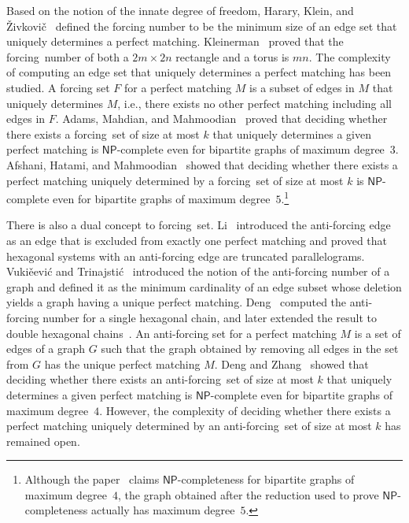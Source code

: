 \documentclass[a4paper,10pt]{article}
\newcommand{\NP}{$\mathsf{NP}$}
\newcommand{\NPc}{$\mathsf{NP}$-complete}
\newcommand{\FS}{\rm forcing~set}
\newcommand{\AFS}{\rm anti-forcing~set}
\newcommand{\FN}{\rm forcing~number}
\begin{document}
Based on the notion of the innate degree of freedom, Harary, Klein, and {\v{Z}}ivkovi{\v{c}}~\cite{harary1991graphical} defined the forcing number to be the minimum size of an edge set that uniquely determines a perfect matching.
Kleinerman~\cite{kleinerman2006bounds} proved that the {\FN} of both a $2m \times 2n$ rectangle and a torus is $mn$.
The complexity of computing an edge set that uniquely determines a perfect matching has been studied.
A forcing set $F$ for a perfect matching $M$ is a subset of edges in $M$ that uniquely determines $M$, i.e., there exists no other perfect matching including all edges in $F$.
Adams, Mahdian, and Mahmoodian~\cite{adams2004forced} proved that deciding whether there exists a {\FS} of size at most $k$ that uniquely determines a given perfect matching is {\NPc} even for bipartite graphs of maximum degree~$3$.
Afshani, Hatami, and Mahmoodian~\cite{afshani2009spectrum} showed that deciding whether there exists a perfect matching uniquely determined by a {\FS} of size at most $k$ is {\NPc} even for bipartite graphs of maximum degree~$5$.\footnote{Although the paper~\cite{afshani2009spectrum} claims {\NP}-completeness for bipartite graphs of maximum degree~$4$, the graph obtained after the reduction used to prove {\NP}-completeness actually has maximum degree~$5$.} 

There is also a dual concept to {\FS}.
Li~\cite{LI1997295} introduced the anti-forcing edge as an edge that is excluded from exactly one perfect matching and proved that hexagonal systems with an anti-forcing edge are truncated parallelograms.
Vuki{\v{e}}evi{\'c} and Trinajsti{\'c}~\cite{vukiveevic2007anti} introduced the notion of the anti-forcing number of a graph and defined it as the minimum cardinality of an edge subset whose deletion yields a graph having a unique perfect matching.
Deng~\cite{deng2007anti} computed the anti-forcing number for a single hexagonal chain, and later extended the result to double hexagonal chains~\cite{deng2008anti}.
An anti-forcing set for a perfect matching $M$ is a set of edges of a graph $G$ such that the graph obtained by removing all edges in the set from $G$ 
has the unique perfect matching $M$.
Deng and Zhang~\cite{deng2017anti} showed that deciding whether there exists an {\AFS} of size at most $k$ that uniquely determines a given perfect matching is {\NPc} even for bipartite graphs of maximum degree~$4$.
However, the complexity of deciding whether there exists a perfect matching uniquely determined by an {\AFS} of size at most $k$ has remained open.
\end{document}
